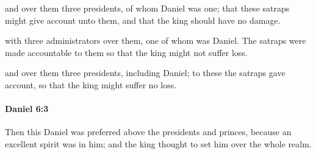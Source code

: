 			\begin{versebox}
					\item[BHS] 
					\item[LXX] 
					\item[ASV] and over them three presidents, of whom Daniel was one; that these satraps might give account unto them, and that the king should have no damage.
					\item[NIV] with three administrators over them, one of whom was Daniel. The satraps were made accountable to them so that the king might not suffer loss.
					\item[NRSV] and over them three presidents, including Daniel; to these the satraps gave account, so that the king might suffer no loss.
			\end{versebox}

		\paragraph{Daniel 6:3} %
			\label{DANIEL-6-3}

			Then this Daniel was preferred above the presidents and princes, because an excellent spirit was in him; and the king thought to set him over the whole realm.

